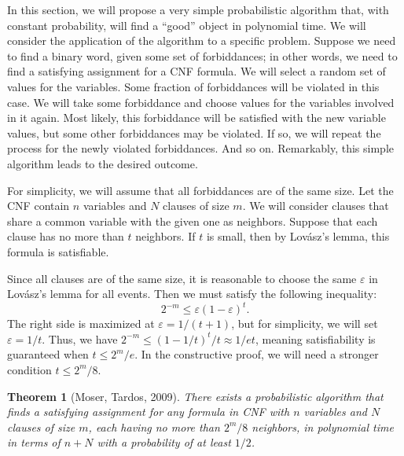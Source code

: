 \documentclass[12pt,sans]{article}
\theoremstyle{definition}
\theoremstyle{plain}
\newtheorem{theorem}{Theorem}[section]
\theoremstyle{remark}
\begin{document}
In this section, we will propose a very simple probabilistic algorithm
that, with constant probability, will find a ``good'' object in polynomial time. We will consider the application of the algorithm to
a specific problem. Suppose we need to find a binary word, given
some set of forbiddances; in other words, we need to find a satisfying assignment for a CNF formula. We will select a random set of values for the variables. Some
fraction of forbiddances will be violated in this case. We will take some
forbiddance and choose values for the variables involved in it again.
Most likely, this forbiddance will be satisfied with the new variable values,
but some other forbiddances may be violated. If so, we will repeat the process
for the newly violated forbiddances. And so on. Remarkably,
this simple algorithm leads to the desired outcome.

For simplicity, we will assume that all forbiddances are of the same size.
Let the CNF contain $n$ variables and $N$ clauses of size $m$. We will consider clauses that share a common variable with the given one as neighbors. Suppose that
each clause has no more than $t$ neighbors. If $t$ is small,
then by Lovász's lemma, this formula is satisfiable.

Since all clauses are of the same size, it is reasonable to choose
the same $\varepsilon$ in Lovász's lemma for all events. Then we must satisfy the following inequality:
\[
2^{-m} \le \varepsilon(1-\varepsilon)^t.
\]
The right side is maximized at $\varepsilon = 1/(t+1)$, but for simplicity, we will set $\varepsilon = 1/t$.
Thus, we have $2^{-m} \le (1-1/t)^t/t \approx 1/et$, meaning satisfiability is guaranteed when $t \le 2^m/e$.
In the constructive proof, we will need a stronger condition $t \le 2^m/8$.

\begin{theorem}[Moser, Tardos, 2009]
    There exists a probabilistic algorithm that finds a satisfying assignment for any formula in
    CNF with $n$ variables and $N$ clauses of size $m$, each having no more than $2^m/8$
    neighbors, in polynomial time in terms of $n + N$ with a probability of at least $1/2$.
\end{theorem}
\end{document}
